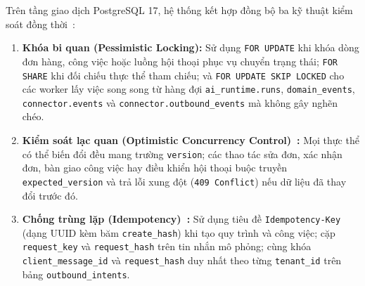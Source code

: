 Trên tầng giao dịch PostgreSQL 17, hệ thống kết hợp đồng bộ ba kỹ thuật kiểm soát đồng thời~\cite{gray1992transaction}:
\begin{enumerate}
  \item \textbf{Khóa bi quan (Pessimistic Locking):} Sử dụng \texttt{FOR UPDATE} khi khóa dòng đơn hàng, công việc hoặc luồng hội thoại phục vụ chuyển trạng thái; \texttt{FOR SHARE} khi đối chiếu
    thực thể tham chiếu; và \texttt{FOR UPDATE SKIP LOCKED} cho các worker lấy việc song song từ hàng đợi \texttt{ai\_\hspace{0pt}runtime.\hspace{0pt}runs}, \texttt{domain\_\hspace{0pt}events}, \texttt{connector.\hspace{0pt}events} và
    \texttt{connector.\hspace{0pt}outbound\_\hspace{0pt}events} mà không gây nghẽn chéo.
  \item \textbf{Kiểm soát lạc quan (Optimistic Concurrency Control)~\cite{kung1981optimistic,fowler2002peaa}:} Mọi thực thể có thể biến đổi đều mang trường \texttt{version}; các thao tác sửa đơn, xác nhận đơn, bàn giao công việc hay
    điều khiển hội thoại buộc truyền \texttt{expected\_\hspace{0pt}version} và trả lỗi xung đột (\texttt{409 Conflict}) nếu dữ liệu đã thay đổi trước đó.
  \item \textbf{Chống trùng lặp (Idempotency)~\cite{hohpe2003eip}:} Sử dụng tiêu đề \texttt{Idempotency-\hspace{0pt}Key} (dạng UUID kèm băm \texttt{create\_\hspace{0pt}hash}) khi tạo quy trình và công việc; cặp \texttt{request\_\hspace{0pt}key}
    và \texttt{request\_\hspace{0pt}hash} trên tin nhắn mô phỏng; cùng khóa \texttt{client\_\hspace{0pt}message\_\hspace{0pt}id} và \texttt{request\_\hspace{0pt}hash} duy nhất theo từng \texttt{tenant\_\hspace{0pt}id} trên bảng \texttt{outbound\_\hspace{0pt}intents}.
\end{enumerate}

